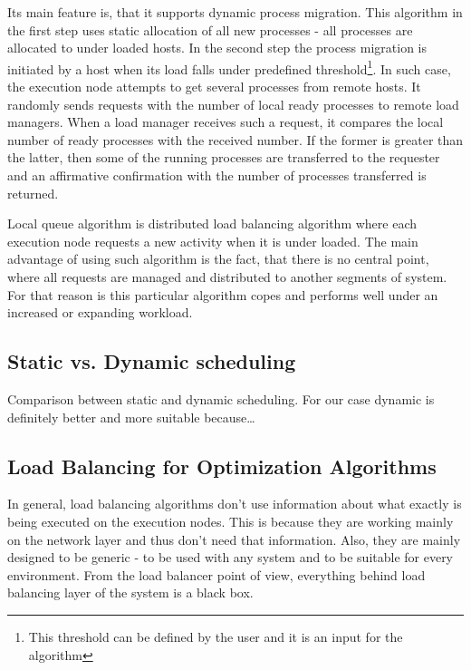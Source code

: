 Its main feature is, that it supports dynamic process migration.
This algorithm in the first step uses static allocation of all new processes - all processes are allocated to under loaded hosts.
In the second step the process migration is initiated by a host when its load falls under predefined threshold\footnote{
This threshold can be defined by the user and it is an input for the algorithm}.
In such case, the execution node attempts to get several processes from remote hosts.
It randomly sends requests with the number of local ready processes to remote load managers.
When a load manager receives such a request, it compares the local number of ready processes with the received number.
If the former is greater than the latter, then some of the running processes are transferred to the requester
and an affirmative confirmation with the number of processes transferred is returned.\cite{sharma2008performance}

Local queue algorithm is distributed load balancing algorithm where each execution node requests a new activity when it is under loaded.
The main advantage of using such algorithm is the fact, that there is no central point,
where all requests are managed and distributed to another segments of system.
For that reason is this particular algorithm copes and performs well under an increased or expanding workload.

\subsection{Static vs.
Dynamic scheduling}\label{subsec:static-vs.-dynamic-scheduling}
Comparison between static and dynamic scheduling.
For our case dynamic is definitely better and more suitable because\ldots

\subsection{Load Balancing for Optimization Algorithms}\label{subsec:load-balancing-for-optimization-algorithms}
In general, load balancing algorithms don't use information about what exactly is being executed on the execution nodes.
This is because they are working mainly on the network layer and thus don't need that information.
Also, they are mainly designed to be generic - to be used with any system and to be suitable for every environment.
From the load balancer point of view, everything behind load balancing layer of the system is a black box.

